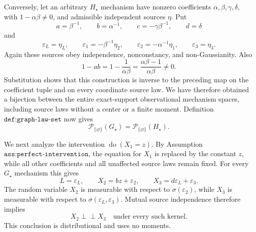 Conversely, let an arbitrary \(H_\star\) mechanism have nonzero coefficients \(\alpha,\beta,\gamma,\delta\), with \(1-\alpha\beta\ne0\), and admissible independent sources \(\eta\). Put
\[
 a=\beta^{-1},\qquad b=\alpha^{-1},\qquad
 c=-\gamma\beta^{-1},\qquad d=\delta
\]
and
\[
 \varepsilon_L=\eta_L,\qquad
 \varepsilon_1=-\beta^{-1}\eta_2,\qquad
 \varepsilon_2=-\alpha^{-1}\eta_1,\qquad
 \varepsilon_3=\eta_3.
\]
Again these sources obey independence, nonconstancy, and non-Gaussianity. Also
\[
 1-ab=1-\frac{1}{\alpha\beta}
 =\frac{\alpha\beta-1}{\alpha\beta}\ne0.
\]
Substitution shows that this construction is inverse to the preceding map on the coefficient tuple and on every coordinate source law. We have therefore obtained a bijection between the entire exact-support observational mechanism spaces, including source laws without a center or a finite moment. Definition \(\texttt{def:graph-law-set}\) now gives
\[
 \mathcal P_{\{\varnothing\}}(G_\star)
 =\mathcal P_{\{\varnothing\}}(H_\star).
\]

We next analyze the intervention \(\operatorname{do}(X_1=z)\). By Assumption \(\texttt{ass:perfect-intervention}\), the equation for \(X_1\) is replaced by the constant \(z\), while all other coefficients and all unaffected source laws remain fixed. For every \(G_\star\) mechanism this gives
\[
 L=\varepsilon_L,\qquad
 X_2=bz+\varepsilon_2,\qquad
 X_3=d\varepsilon_L+\varepsilon_3.
\]
The random variable \(X_2\) is measurable with respect to \(\sigma(\varepsilon_2)\), while \(X_3\) is measurable with respect to \(\sigma(\varepsilon_L,\varepsilon_3)\). Mutual source independence therefore implies
\[
 X_2\mathbin{\perp\!\!\!\perp}X_3
 \quad\text{under every such kernel}.
\]
This conclusion is distributional and uses no moments.


